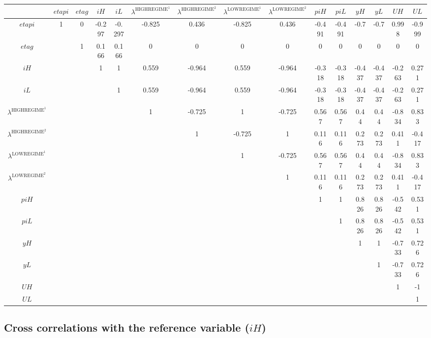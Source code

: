\begin{tabular}{c|cccccccccccccc|}
  & ${e\!t\!a\!p\!i}$ & ${e\!t\!a\!g}$ & ${i\!H}$ & ${i\!L}$ & $\lambda^{\mathrm{HIGHREGIME}^{\mathrm{1}}}$ & $\lambda^{\mathrm{HIGHREGIME}^{\mathrm{2}}}$ & $\lambda^{\mathrm{LOWREGIME}^{\mathrm{1}}}$ & $\lambda^{\mathrm{LOWREGIME}^{\mathrm{2}}}$ & ${p\!i\!H}$ & ${p\!i\!L}$ & ${y\!H}$ & ${y\!L}$ & ${U\!H}$ & ${U\!L}$\\
\hline
${e\!t\!a\!p\!i}$ & 1 & 0 & -0.297 & -0.297 & -0.825 & 0.436 & -0.825 & 0.436 & -0.491 & -0.491 & -0.7 & -0.7 & 0.998 & -0.999 \\
${e\!t\!a\!g}$ &  & 1 & 0.166 & 0.166 & 0 & 0 & 0 & 0 & 0 & 0 & 0 & 0 & 0 & 0 \\
${i\!H}$ &  &  & 1 & 1 & 0.559 & -0.964 & 0.559 & -0.964 & -0.318 & -0.318 & -0.437 & -0.437 & -0.263 & 0.271 \\
${i\!L}$ &  &  &  & 1 & 0.559 & -0.964 & 0.559 & -0.964 & -0.318 & -0.318 & -0.437 & -0.437 & -0.263 & 0.271 \\
$\lambda^{\mathrm{HIGHREGIME}^{\mathrm{1}}}$ &  &  &  &  & 1 & -0.725 & 1 & -0.725 & 0.567 & 0.567 & 0.44 & 0.44 & -0.834 & 0.833 \\
$\lambda^{\mathrm{HIGHREGIME}^{\mathrm{2}}}$ &  &  &  &  &  & 1 & -0.725 & 1 & 0.116 & 0.116 & 0.273 & 0.273 & 0.411 & -0.417 \\
$\lambda^{\mathrm{LOWREGIME}^{\mathrm{1}}}$ &  &  &  &  &  &  & 1 & -0.725 & 0.567 & 0.567 & 0.44 & 0.44 & -0.834 & 0.833 \\
$\lambda^{\mathrm{LOWREGIME}^{\mathrm{2}}}$ &  &  &  &  &  &  &  & 1 & 0.116 & 0.116 & 0.273 & 0.273 & 0.411 & -0.417 \\
${p\!i\!H}$ &  &  &  &  &  &  &  &  & 1 & 1 & 0.826 & 0.826 & -0.542 & 0.531 \\
${p\!i\!L}$ &  &  &  &  &  &  &  &  &  & 1 & 0.826 & 0.826 & -0.542 & 0.531 \\
${y\!H}$ &  &  &  &  &  &  &  &  &  &  & 1 & 1 & -0.733 & 0.726 \\
${y\!L}$ &  &  &  &  &  &  &  &  &  &  &  & 1 & -0.733 & 0.726 \\
${U\!H}$ &  &  &  &  &  &  &  &  &  &  &  &  & 1 & -1 \\
${U\!L}$ &  &  &  &  &  &  &  &  &  &  &  &  &  & 1 \\
\hline
\end{tabular}


\subsection{Cross correlations with the reference variable (${i\!H}$)}

